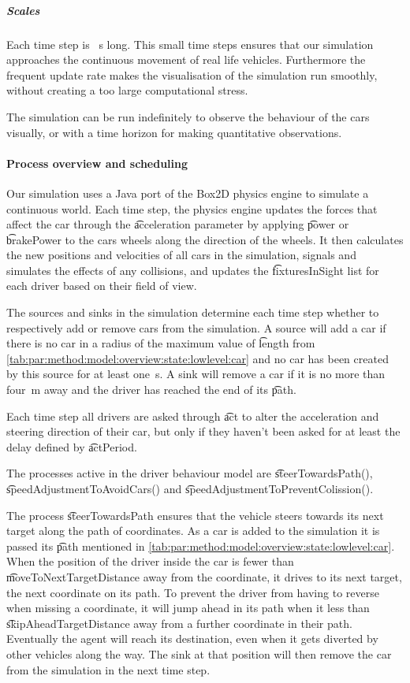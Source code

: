 \subparagraph{Scales}
Each time step is \si{s} long. This small time steps ensures that our simulation approaches the continuous movement of real life vehicles. Furthermore the frequent update rate makes the visualisation of the simulation run smoothly, without creating a too large computational stress.

The simulation can be run indefinitely to observe the behaviour of the cars visually, or with a time horizon for making quantitative observations.

\paragraph{Process overview and scheduling}
\label{par:method:model:overview:process}
Our simulation uses a Java port of the Box2D physics engine to simulate a continuous world. Each time step, the physics engine updates the forces that affect the car through the \t{acceleration} parameter by applying \t{power} or \t{brakePower} to the cars wheels along the direction of the wheels. It then calculates the new positions and velocities of all cars in the simulation, signals and simulates the effects of any collisions, and updates the \t{fixturesInSight} list for each driver based on their field of view.

The sources and sinks in the simulation determine each time step whether to respectively add or remove cars from the simulation. A source will add a car if there is no car in a radius of the maximum value of \t{length} from \cref{tab:par:method:model:overview:state:lowlevel:car} and no car has been created by this source for at least \si{one \second}. A sink will remove a car if it is no more than \si{four \meter} away and the driver has reached the end of its \t{path}.

Each time step all drivers are asked through \t{act} to alter the acceleration and steering direction of their car, but only if they haven't been asked for at least the delay defined by \t{actPeriod}.

The processes active in the driver behaviour model are \t{steerTowardsPath()}, \t{speedAdjustmentToAvoidCars()} and \t{speedAdjustmentToPreventColission()}.

The process \t{steerTowardsPath} ensures that the vehicle steers towards its next target along the path of coordinates. As a car is added to the simulation it is passed its \t{path} mentioned in \cref{tab:par:method:model:overview:state:lowlevel:car}. When the position of the driver inside the car is fewer than \t{moveToNextTargetDistance} away from the coordinate, it drives to its next target, the next coordinate on its path. To prevent the driver from having to reverse when missing a coordinate, it will jump ahead in its path when it less than \t{skipAheadTargetDistance} away from a further coordinate in their path. Eventually the agent will reach its destination, even when it gets diverted by other vehicles along the way. The sink at that position will then remove the car from the simulation in the next time step.

